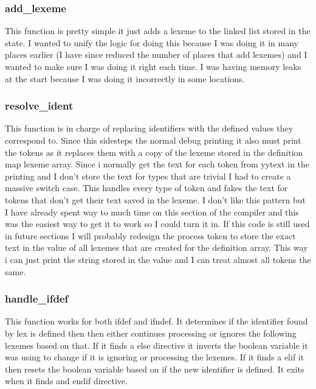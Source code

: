 \documentclass[11pt]{article}
\begin{document}
            \subsubsection{add\_lexeme}
                This function is pretty simple it just adds a lexeme to the linked list stored in the state. I wanted to unify 
                the logic for doing this because I was doing it in many places earlier (I have since reduced the number of places that
                add lexemes) and I wanted to make sure I was doing it right each time. I was having memory leaks at the start because I
                was doing it incorrectly in some locations.

            \subsubsection{resolve\_ident}
                This function is in charge of replacing identifiers with the defined values they correspond to. Since this sidesteps the
                normal debug printing it also must print the tokens as it replaces them with a copy of the 
                lexeme stored in the definition map lexeme array. Since i normally get the text for each
                token from yytext in the printing and I don't store the text for types that are trivial I had to create
                a massive switch case. This handles every type of token and fakes the text for tokens that don't get their text
                saved in the lexeme. I don't like this pattern but I have already spent way to much time on this section of the compiler
                and this was the easiest way to get it to work so I could turn it in. If this code is still used in future sections
                I will probably redesign the process token to store the exact text in the value of all lexemes that are created for
                the definition array. This way i can just print the string stored in the value and I can treat almost all tokens the same.

            \subsubsection{handle\_ifdef}
                This function works for both ifdef and ifndef. It determines if the identifier found by lex is defined
                then then either continues processing or ignores the following lexemes based on that. If it finds
                a else  directive it inverts the boolean variable it was using to change if it is ignoring or processing 
                the lexemes. If it finds a elif it then resets the boolean variable based on if the new identifier is defined.
                It exits when it finds and endif directive.
\end{document}
